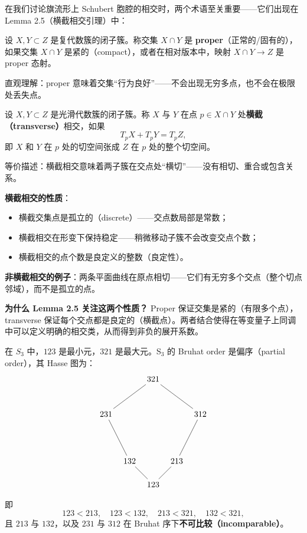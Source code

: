 在我们讨论旗流形上 Schubert 胞腔的相交时，两个术语至关重要——它们出现在 Lemma 2.5（横截相交引理）中：

\begin{Definition}[Proper（正常/固有）交集]
\label{def:ProperIntersection}
设 $X, Y \subset Z$ 是复代数簇的闭子簇。称交集 $X \cap Y$ 是 \textbf{proper}（正常的/固有的），如果交集 $X \cap Y$ 是紧的（compact），或者在相对版本中，映射 $X \cap Y \to Z$ 是 proper 态射。

直观理解：proper 意味着交集``行为良好''——不会出现无穷多点，也不会在极限处丢失点。
\end{Definition}

\begin{Definition}[Transverse（横截）交集]
\label{def:TransverseIntersection}
设 $X, Y \subset Z$ 是光滑代数簇的闭子簇。称 $X$ 与 $Y$ 在点 $p \in X \cap Y$ 处\textbf{横截（transverse）}相交，如果
\[
T_p X + T_p Y = T_p Z,
\]
即 $X$ 和 $Y$ 在 $p$ 处的切空间张成 $Z$ 在 $p$ 处的整个切空间。

等价描述：横截相交意味着两子簇在交点处``横切''——没有相切、重合或包含关系。

\textbf{横截相交的性质}：
\begin{itemize}
\item 横截交集点是孤立的（discrete）——交点数局部是常数；
\item 横截相交在形变下保持稳定——稍微移动子簇不会改变交点个数；
\item 横截相交的点个数是良定义的整数（良定性）。
\end{itemize}

\textbf{非横截相交的例子}：两条平面曲线在原点相切——它们有无穷多个交点（整个切点邻域），而不是孤立的点。
\end{Definition}

\textbf{为什么 Lemma 2.5 关注这两个性质？} Proper 保证交集是紧的（有限多个点），transverse 保证每个交点都是良定的（横截点）。两者结合使得在等变量子上同调中可以定义明确的相交类，从而得到非负的展开系数。

\begin{Example}
在 $S_3$ 中，$123$ 是最小元，$321$ 是最大元。S$_3$ 的 Bruhat order 是偏序（partial order），其 Hasse 图为：
\[
\begin{tikzpicture}[node distance=1.5cm]
\node (321) at (0,4) {$321$};
\node (312) at (2,2.5) {$312$};
\node (231) at (-2,2.5) {$231$};
\node (132) at (-1,0.5) {$132$};
\node (213) at (1,0.5) {$213$};
\node (123) at (0,-0.5) {$123$};

\draw (123) -- (132);
\draw (123) -- (213);
\draw (132) -- (231);
\draw (213) -- (312);
\draw (231) -- (321);
\draw (312) -- (321);
\end{tikzpicture}
\]
即
\[
123 < 213, \quad 123 < 132, \quad 213 < 321, \quad 132 < 321,
\]
且 $213$ 与 $132$，以及 $231$ 与 $312$ 在 Bruhat 序下\textbf{不可比较（incomparable）}。
\end{Example}

